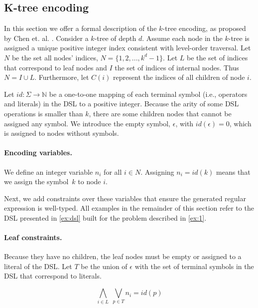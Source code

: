 \subsection{K-tree encoding}

In this section we offer a formal description of the \(k\)-tree encoding, as proposed by Chen et. al. \cite{DBLP:conf/sigsoft/ChenMF19}.
Consider a \(k\)-tree of depth \(d\). Assume each node in the \(k\)-tree is assigned a unique positive integer index consistent with level-order traversal. Let \(N\) be the set all nodes' indices, \(N = \{1, 2, ..., k^d - 1\}\).
%
Let \(L\) be the set of indices that correspond to leaf nodes and \(I\) the set of indices of internal nodes. Thus \(N = I \cup L\). Furthermore, let \(C(i)\) represent the indices of all children of node \(i\).

Let \(id: \Sigma \to \mathbb{N}\) be a one-to-one mapping of each terminal symbol (i.e., operators and literals) in the DSL to a positive integer.
Because the arity of some DSL operations is smaller than \(k\), there are some children nodes that cannot be assigned any symbol. We introduce the empty symbol, \(\epsilon\), with \(id(\epsilon) = 0\), which is assigned to nodes without symbols.

\paragraph{Encoding variables.}
We define an integer variable \(n_i\) for all \(i \in N\). Assigning \(n_i = id(k)\) means
that we assign the symbol~\(k\) to node \(i\).

\medskip

Next, we add constraints over these variables that ensure the generated regular expression is well-typed. 
All examples in the remainder of this section refer to the DSL presented in \autoref{ex:dsl} built for the
problem described in \autoref{ex:1}.

\paragraph{Leaf constraints.} 
Because they have no children, the leaf nodes must be empty or assigned to a literal of the DSL.
Let \(T\) be the union of \(\epsilon\) with the set of terminal symbols in the DSL that correspond to literals.

\begin{equation}
    \bigwedge_{i \in L} \; \bigvee_{p \in T} n_i = id(p)
\end{equation}

